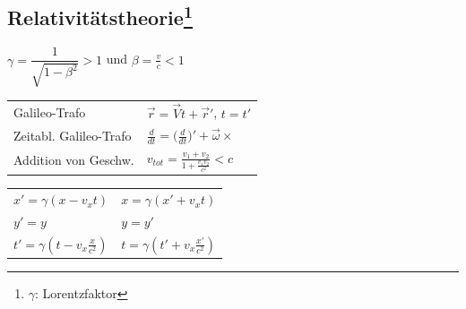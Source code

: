 \documentclass[12pt,a4paper]{article}
\renewcommand{\d}[2]{\frac{d #1}{d #2}}
\renewcommand{\=}[1]{\stackrel{#1}{=}}
\theoremstyle{definition}
\theoremstyle{remark}
\begin{document}
\subsection[Relativitätstheorie]{Relativitätstheorie\let\thefootnote\relax\footnote{$\gamma$: Lorentzfaktor}}

\begin{center}
\begin{minipage}[t]{.45\linewidth}
\vspace{0pt}

\begin{framed}
$\gamma = \dfrac{1}{\sqrt{1 - \beta^2}} > 1$ und $\beta = \frac{v}{c} <1$
\end{framed}

\begin{tabular}{ll}
Galileo-Trafo & $\vec{r} = \vec{V}t + \vec{r}'$, $t = t'$\\
Zeitabl. Galileo-Trafo & $\d{}{t} = \Big(\d{}{t}\Big)' + \vec{\omega} \times$\\
Addition von Geschw. & $v_{tot} = \frac{v_1 + v_2}{1 + \frac{v_1 v_2}{c^2}} < c$\\
\end{tabular}

\begin{framed}
\begin{tabular}{ll}
$x\prime=\gamma(x - v_xt)$ & $x=\gamma(x\prime+v_xt)$ \\
$y\prime=y$ & $y=y\prime$\\
$t\prime=\gamma(t-v_x \frac{x}{c^2})$ & $t=\gamma(t\prime+v_x \frac{x\prime}{c^2})$\\
\end{tabular}
\end{framed}


\end{minipage}
\end{center}
\end{document}

